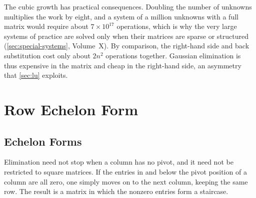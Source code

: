 \begin{table}
\end{table}

The cubic growth has practical consequences. Doubling the number of unknowns multiplies the work by eight, and a system of a million unknowns with a full matrix would require about $7\times10^{17}$ operations, which is why the very large systems of practice are solved only when their matrices are sparse or structured (\cref{sec:special-systems}, Volume~X). By comparison, the right-hand side and back substitution cost only about $2n^2$ operations together. Gaussian elimination is thus expensive in the matrix and cheap in the right-hand side, an asymmetry that \cref{sec:lu} exploits.
\section{Row Echelon Form}
\label{sec:echelon}

\subsection{Echelon Forms}

Elimination need not stop when a column has no pivot, and it need not be restricted to square matrices. If the entries in and below the pivot position of a column are all zero, one simply moves on to the next column, keeping the same row. The result is a matrix in which the nonzero entries form a staircase.

